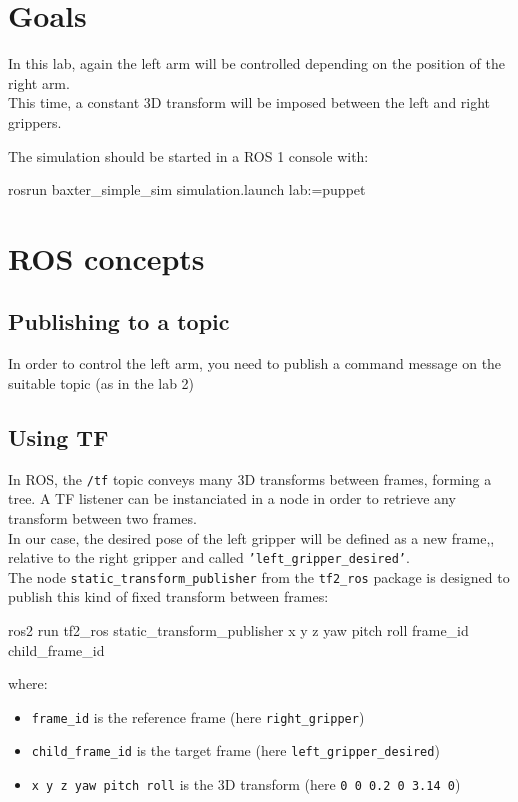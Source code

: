 \documentclass{ecnreport}
\author{O. Kermorgant}
\begin{document}


\section{Goals}

In this lab, again the left arm will be controlled depending on the position of the right arm.\\
This time, a constant 3D transform will be imposed between the left and right grippers. 

The simulation should be started in a ROS 1 console with:
\begin{bashcodelarge}
 rosrun baxter_simple_sim simulation.launch lab:=puppet
\end{bashcodelarge}

\section{ROS concepts}

\subsection{Publishing to a topic}

In order to control the left arm, you need to publish a command message on the suitable topic (as in the lab 2)

\subsection{Using TF}

In ROS, the \texttt{/tf} topic conveys many 3D transforms between frames, forming a tree. A TF listener can be instanciated in a node in order to retrieve any transform between two frames. \\
In our case, the desired pose of the left gripper will be defined as a new frame,,  relative to the right gripper and called \texttt{'left\_gripper\_desired'}.\\
The node \texttt{static\_transform\_publisher} from the \texttt{tf2\_ros} package is designed to publish this kind of fixed transform between frames:
\begin{bashcodelarge}
 ros2 run tf2_ros static_transform_publisher x y z yaw pitch roll frame_id child_frame_id
\end{bashcodelarge}where:
\begin{itemize}
\item \texttt{frame\_id} is the reference frame (here \texttt{right\_gripper})
\item \texttt{child\_frame\_id} is the target frame (here \texttt{left\_gripper\_desired})
 \item \texttt{x y z yaw pitch roll} is the 3D transform (here \texttt{0 0 0.2 0 3.14 0})
\end{itemize}
\end{document}
